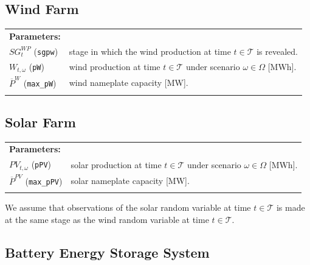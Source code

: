 \subsection{Wind Farm}
\label{SEC:WindFarm}

\begin{tabularx}{\textwidth}{l X}
    
    \textbf{Parameters:} \\
	$SG^{WP}_t$ (\texttt{sgpw}) & stage in which the wind production at time $t \in \mathcal{T}$ is revealed. \\
	$W_{t, \omega}$ (\texttt{pW}) & wind production at time $t \in \mathcal{T}$ under scenario $\omega \in \Omega$ [MWh]. \\
	$\overline{P}^W$ (\texttt{max\_pW}) & wind nameplate capacity [MW]. \\
	\\  
\end{tabularx}

\subsection{Solar Farm}
\label{SEC:SolarFarm}

\begin{tabularx}{\textwidth}{l X}
    
    \textbf{Parameters:} \\
	$PV_{t, \omega}$ (\texttt{pPV}) & solar production at time $t \in \mathcal{T}$ under scenario $\omega \in \Omega$ [MWh]. \\
	$\overline{P}^{PV}$ (\texttt{max\_pPV}) & solar nameplate capacity [MW]. \\
	\\  
\end{tabularx}

We assume that observations of the solar random variable at time $t \in \mathcal{T}$ is made at the same stage as the wind random variable at time $t \in \mathcal{T}$.

\subsection{Battery Energy Storage System}
\label{SEC:BatteryEnergyStorageSystem}

